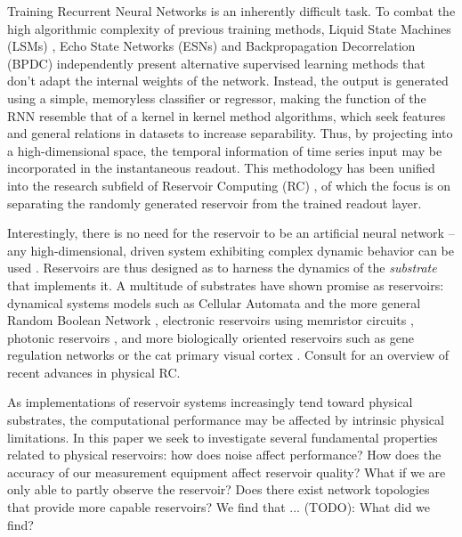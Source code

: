 Training Recurrent Neural Networks is an inherently difficult task. To combat
the high algorithmic complexity of previous training methods, Liquid State
Machines (LSMs) \cite{maass_real-time_2002}, Echo State Networks (ESNs)
\cite{jaeger_echo_2001} and Backpropagation Decorrelation (BPDC)
\cite{steil_backpropagation-decorrelation:_2004} independently present
alternative supervised learning methods that don't adapt the internal weights of
the network. Instead, the output is generated using a simple, memoryless
classifier or regressor, making the function of the RNN resemble that of a
kernel in kernel method algorithms, which seek features and general relations in
datasets to increase separability. Thus, by projecting into a high-dimensional
space, the temporal information of time series input may be incorporated in the
instantaneous readout. This methodology has been unified into the research
subfield of Reservoir Computing (RC) \cite{schrauwen_overview_2007}, of which
the focus is on separating the randomly generated reservoir from the trained
readout layer.

Interestingly, there is no need for the reservoir to be an artificial neural
network -- any high-dimensional, driven system exhibiting complex dynamic
behavior can be used \cite{schrauwen_overview_2007}. Reservoirs are thus
designed as to harness the dynamics of the \textit{substrate} that implements
it. A multitude of substrates have shown promise as reservoirs: dynamical
systems models such as Cellular Automata \cite{nichele_deep_2017} and the more
general Random Boolean Network \cite{snyder_computational_2013}, electronic
reservoirs using memristor circuits \cite{kulkarni_memristor-based_2012},
photonic reservoirs \cite{vandoorne_experimental_2014}, and more biologically
oriented reservoirs such as gene regulation networks \cite{jones_is_2007} or the
cat primary visual cortex \cite{scholkopf_temporal_2007}. Consult
\cite{tanaka_recent_2018} for an overview of recent advances in physical RC.

As implementations of reservoir systems increasingly tend toward physical
substrates, the computational performance may be affected by intrinsic physical
limitations. In this paper we seek to investigate several fundamental properties
related to physical reservoirs: how does noise affect performance? How does the
accuracy of our measurement equipment affect reservoir quality? What if we are
only able to partly observe the reservoir? Does there exist network topologies
that provide more capable reservoirs? We find that ... (TODO): What did we find?



